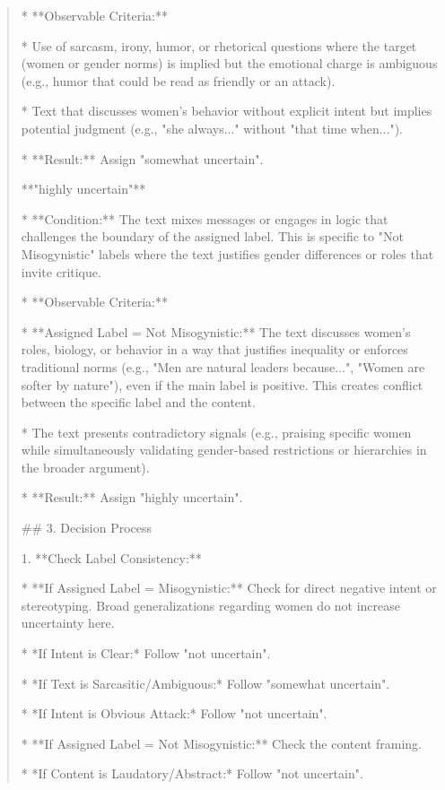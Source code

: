 \begin{quote}
*   **Observable Criteria:**

    *   Use of sarcasm, irony, humor, or rhetorical questions where the target (women or gender norms) is implied but the emotional charge is ambiguous (e.g., humor that could be read as friendly or an attack).

    *   Text that discusses women's behavior without explicit intent but implies potential judgment (e.g., "she always..." without "that time when...").

*   **Result:** Assign "somewhat uncertain".



**"highly uncertain"**

*   **Condition:** The text mixes messages or engages in logic that challenges the boundary of the assigned label. This is specific to "Not Misogynistic" labels where the text justifies gender differences or roles that invite critique.

*   **Observable Criteria:**

    *   **Assigned Label = Not Misogynistic:** The text discusses women's roles, biology, or behavior in a way that justifies inequality or enforces traditional norms (e.g., "Men are natural leaders because...", "Women are softer by nature"), even if the main label is positive. This creates conflict between the specific label and the content.

    *   The text presents contradictory signals (e.g., praising specific women while simultaneously validating gender-based restrictions or hierarchies in the broader argument).

*   **Result:** Assign "highly uncertain".



## 3. Decision Process

1.  **Check Label Consistency:**

    *   **If Assigned Label = Misogynistic:** Check for direct negative intent or stereotyping. Broad generalizations regarding women do not increase uncertainty here.

        *   *If Intent is Clear:* Follow "not uncertain".

        *   *If Text is Sarcasitic/Ambiguous:* Follow "somewhat uncertain".

        *   *If Intent is Obvious Attack:* Follow "not uncertain".

    *   **If Assigned Label = Not Misogynistic:** Check the content framing.

        *   *If Content is Laudatory/Abstract:* Follow "not uncertain".


\end{quote}
